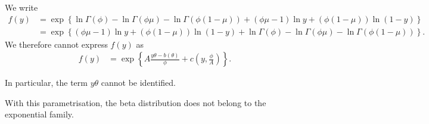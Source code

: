 \documentclass[a4paper,12pt]{article}
\def\op{\left(}
\def\cp{\right)}
\def\ok{\left\{}
\def\ck{\right\}}
\begin{document}
{\color{blue} 
We write
\begin{align*}
  f(y)&=\exp\ok\ln\Gamma\op\phi\cp - \ln\Gamma\op \phi \mu \cp - \ln \Gamma\op \phi\op1-\mu\cp\cp +\op\phi\mu-1\cp\ln y + \op \phi\op1-\mu\cp\cp \ln \op 1-y\cp \ck\\
  &= \exp \ok \op \phi\mu-1 \cp\ln y + \op \phi\op1-\mu\cp\cp \ln \op 1-y\cp + \ln\Gamma\op\phi\cp - \ln\Gamma\op \phi \mu \cp - \ln \Gamma\op \phi\op1-\mu\cp\cp \ck. 
\end{align*}
We therefore cannot express $f(y)$ as 
\begin{align*}
  f(y)&=\exp\ok A \frac{y\theta - b\op\theta\cp}{\phi} + c\op y, \frac{\phi}{A}\cp\ck.
\end{align*}

In particular, the term $y \theta$ cannot be identified.

With this parametrisation, the beta distribution does not belong to the exponential family.
  
}
\end{document}
